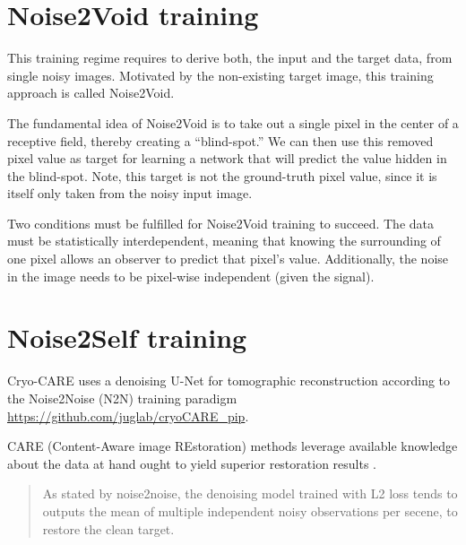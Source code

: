 \section{Noise2Void training}

This training regime requires to derive both, the input and the target
data, from single noisy images. Motivated by the non-existing target
image, this training approach is called Noise2Void. %


The fundamental idea of Noise2Void is to take out a single pixel in
the center of a receptive field, thereby creating a “blind-spot.” We
can then use this removed pixel value as target for learning a network
that will predict the value hidden in the blind-spot. Note, this
target is not the ground-truth pixel value, since it is itself only
taken from the noisy input image. %

Two conditions must be fulfilled for Noise2Void training to
succeed. The data must be statistically interdependent, meaning that
knowing the surrounding of one pixel allows an observer to predict
that pixel’s value. Additionally, the noise in the image needs to be
pixel-wise independent (given the signal). %

\section{Noise2Self training}


Cryo-CARE \cite{buchholz2019cryo} uses a denoising U-Net for
tomographic reconstruction according to the Noise2Noise (N2N)
\cite{lehtinen2018noise2noise} training paradigm
\url{https://github.com/juglab/cryoCARE_pip}.

CARE (Content-Aware image REstoration) methods leverage available
knowledge about the data at hand ought to yield superior restoration
results \cite{weigert2018content}.

\begin{quote}
  As stated by noise2noise, the denoising model trained with L2 loss tends to outputs the mean of multiple independent noisy observations per secene, to restore the clean target.
\end{quote}

